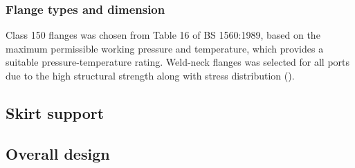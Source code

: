 \subsubsection{Flange types and dimension}
Class 150 flanges was chosen from Table 16 of BS 1560:1989, based on the maximum permissible working pressure and temperature, which provides a suitable pressure-temperature rating. Weld-neck flanges was selected for all ports due to the high structural strength along with stress distribution ().
\subsection{Skirt support}
\subsection{Overall design}

